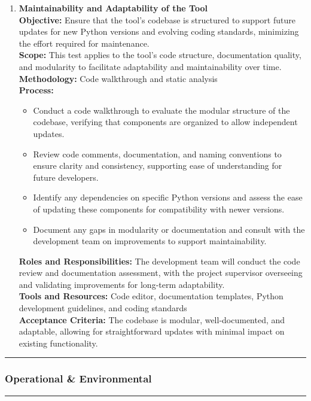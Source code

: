 \documentclass[12pt, titlepage]{article}
\newcommand{\colorrule}{\textcolor{BlueViolet}{\rule{\linewidth}{2pt}}}
\begin{document}
\begin{enumerate}[label={\bf \textcolor{Maroon}{test-PF-\arabic*}}, wide=0pt, font=\itshape]
    \item \textbf{Maintainability and Adaptability of the Tool} \\[2mm]
    \textbf{Objective:} Ensure that the tool’s codebase is structured to support future updates for new Python versions and evolving coding standards, minimizing the effort required for maintenance. \\[2mm]
    \textbf{Scope:} This test applies to the tool’s code structure, documentation quality, and modularity to facilitate adaptability and maintainability over time. \\[2mm]
    \textbf{Methodology:} Code walkthrough and static analysis \\[2mm]
    \textbf{Process:}
    \begin{itemize}
      \item Conduct a code walkthrough to evaluate the modular structure of the codebase, verifying that components are organized to allow independent updates.
      \item Review code comments, documentation, and naming conventions to ensure clarity and consistency, supporting ease of understanding for future developers.
      \item Identify any dependencies on specific Python versions and assess the ease of updating these components for compatibility with newer versions.
      \item Document any gaps in modularity or documentation and consult with the development team on improvements to support maintainability.
    \end{itemize}
    \textbf{Roles and Responsibilities:} The development team will conduct the code review and documentation assessment, with the project supervisor overseeing and validating improvements for long-term adaptability. \\[2mm]
    \textbf{Tools and Resources:} Code editor, documentation templates, Python development guidelines, and coding standards \\[2mm]
    \textbf{Acceptance Criteria:} The codebase is modular, well-documented, and adaptable, allowing for straightforward updates with minimal impact on existing functionality.

\end{enumerate}

\noindent
\colorrule

\subsubsection{Operational \& Environmental}
\colorrule
\end{document}
